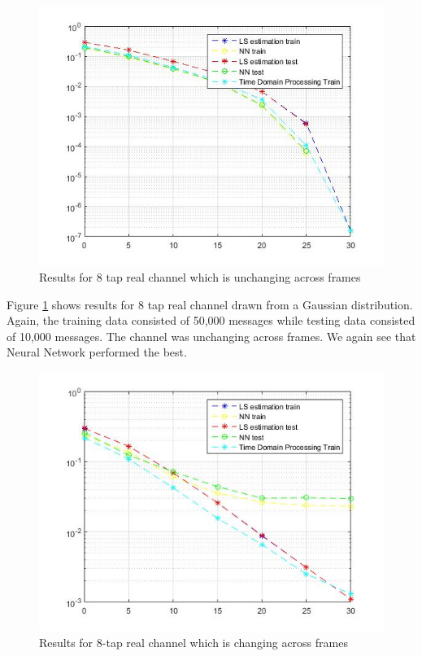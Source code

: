 \begin{figure}[htbp]
  \centering
  \includegraphics[width=\textwidth]{./Figures/real_8tap_res.png}
  \caption{Results for 8 tap real channel which is unchanging across frames}
  \label{fig:real_8tap_res}
\end{figure}
Figure \ref{fig:real_8tap_res} shows results for 8 tap real channel drawn from a Gaussian distribution. Again, the training data consisted of 50,000 messages while testing data consisted of 10,000 messages. The channel was unchanging across frames.  We again see that Neural Network performed the best. \\
\begin{figure}[htbp]
  \centering
  \includegraphics[width=\textwidth]{./Figures/real_8tap_chn.png}
  \caption{Results for 8-tap real channel which is changing across frames}
  \label{fig:real_8tap_chn}
\end{figure}
